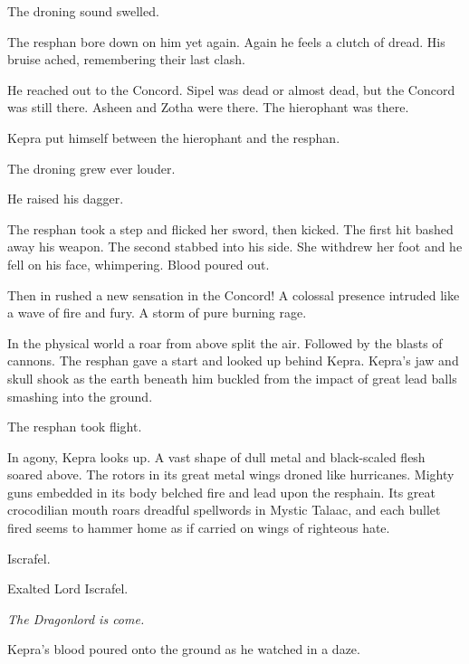 \documentclass
  [a4paper,
   12pt,
   oneside
  ]%
  {article}
\begin{document}
The droning sound swelled.

The resphan bore down on him yet again.
Again he feels a clutch of dread. His bruise ached, remembering their last clash. 

He reached out to the Concord. Sipel was dead or almost dead, but the Concord was still there. 
Asheen and Zotha were there. The hierophant was there. 

Kepra put himself between the hierophant and the resphan.

The droning grew ever louder.

He raised his dagger. 

The resphan took a step and flicked her sword, then kicked. The first hit bashed away his weapon. The second stabbed into his side. 
She withdrew her foot and he fell on his face, whimpering. 
Blood poured out.

Then in rushed a new sensation in the Concord! 
A colossal presence intruded like a wave of fire and fury. 
A storm of pure burning rage.

In the physical world a roar from above split the air. 
Followed by the blasts of cannons. 
The resphan gave a start and looked up behind Kepra. 
Kepra's jaw and skull shook as the earth beneath him buckled from the impact of great lead balls smashing into the ground. 

The resphan took flight. 

In agony, Kepra looks up. 
A vast shape of dull metal and black-scaled flesh soared above. 
The rotors in its great metal wings droned like hurricanes. 
Mighty guns embedded in its body belched fire and lead upon the resphain. 
Its great crocodilian mouth roars dreadful spellwords in Mystic Talaac, and each bullet fired seems to hammer home as if carried on wings of righteous hate. 

Iscrafel. 

Exalted Lord Iscrafel. 

\emph{The Dragonlord is come.}

Kepra’s blood poured onto the ground as he watched in a daze.
% 
% 
\end{document}
